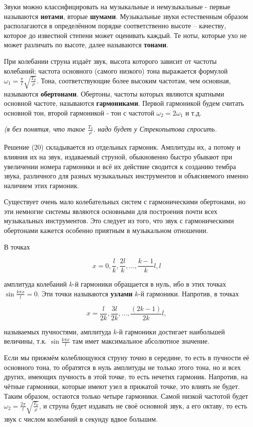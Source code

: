 Звуки можно классифицировать на музыкальные и немузыкальные - первые называются \textbf{нотами}, вторые \textbf{шумами}. Музыкальные звуки естественным образом располагаются в определённом порядке соответственно высоте -- качеству, которое до известной степени может оценивать каждый. Те ноты, которые ухо не может различать по высоте, далее называются \textbf{тонами}.

При колебании струна издаёт звук, высота которого зависит от частоты колебаний; частота основного (самого низкого) тона выражается формулой $\omega_1 = \frac{\pi}{l} \sqrt{\frac{T_0}{\rho}}$. Тона, соответствующие более высоким частотам, чем основная, называются \textbf{обертонами}. Обертоны, частоты которых являются кратными основной частоте, называются \textbf{гармониками}. Первой гармоникой будем считать основной тон, второй гармоникой - тон с частотой $\omega_2 = 2 \omega_1$ и т.д.

\textit{(я без понятия, что такое $\frac{T_0}{\rho}$. надо будет у Стрекопытова спросить.}

Решение (20) складывается из отдельных гармоник. Амплитуды их, а потому и влияния их на звук, издаваемый струной, обыкновенно быстро убывают при увеличении номера гармоники и всё их действие сводится к созданию тембра звука, различного для разных музыкальных инструментов и объясняемого именно наличием этих гармоник.

Существует очень мало колебательных систем с гармоническими обертонами, но эти немногие системы являются основными для построения почти всех музыкальных инструментов. Это следует из того, что звук с гармоническими обертонами кажется особенно приятным в музыкальном отношении.

В точках

\[
	x = 0, \frac{l}{k}, \frac{2l}{k}, \dots, \frac{k-1}{k} l, l
\]

амплитуда колебаний $k$-й гармоники обращается в нуль, ибо в этих точках $\sin \frac{k \pi x}{l}=0$. Эти точки называются \textbf{узлами} $k$-й гармоники. Напротив, в точках

\[
	x = \frac{l}{2k}, \frac{3l}{2k}, \dots, \frac{(2k-1)}{2k} l,
\]

называемых пучностями, амплитуда $k$-й гармоники достигает наибольшей величины, т.к. $\sin \frac{k \pi x}{l}$ там имет максимальное абсолютное значение.

Если мы прижмём колеблющуюся струну точно в середине, то есть в пучности её основного тона, то обратятся в нуль амплитуды не только этого тона, но и всех других, имеющих пучность в этой точке, то есть нечетнх гармоник. Напротив, на чётные гармоники, которые имеют узел в прижатой точке, это влиять не будет. Таким образом, остаются только четыре гармоники. Самой низкой частотой будет $\omega_2 = \frac{2 \pi}{l} \sqrt{\frac{T_0}{\rho}}$, и струна будет издавать не своё основной звук, а его октаву, то есть звук с числом колебаний в секунду вдвое большим.
